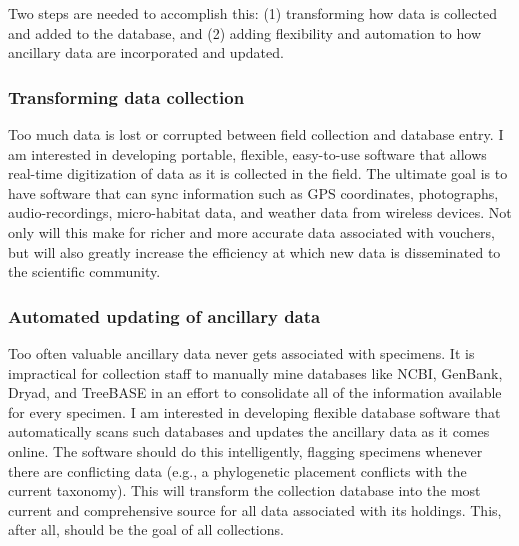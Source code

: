 Two steps are needed to accomplish this: (1) transforming how data is
collected and added to the database, and (2) adding flexibility and automation
to how ancillary data are incorporated and updated.

\subsubsection*{Transforming data collection}
Too much data is lost or corrupted between field collection and database entry.
I am interested in developing portable, flexible, easy-to-use software
that allows real-time digitization of data as it is collected in the field.
The ultimate goal is to have software that can sync information such as
GPS coordinates, photographs, audio-recordings, micro-habitat data, and
weather data from wireless devices.
Not only will this make for richer and more accurate data associated with
vouchers, but will also greatly increase the efficiency at which new
data is disseminated to the scientific community.

\subsubsection*{Automated updating of ancillary data}
Too often valuable ancillary data never gets associated with specimens.
It is impractical for collection staff to manually mine databases like NCBI,
GenBank, Dryad, and TreeBASE in an effort to consolidate all of the information
available for every specimen.
I am interested in developing flexible database software that automatically
scans such databases and updates the ancillary data as it comes online.
The software should do this intelligently, flagging specimens whenever there
are conflicting data (e.g., a phylogenetic placement conflicts with the current
taxonomy).
This will transform the collection database into the most current and
comprehensive source for all data associated with its holdings.
This, after all, should be the goal of all collections.



